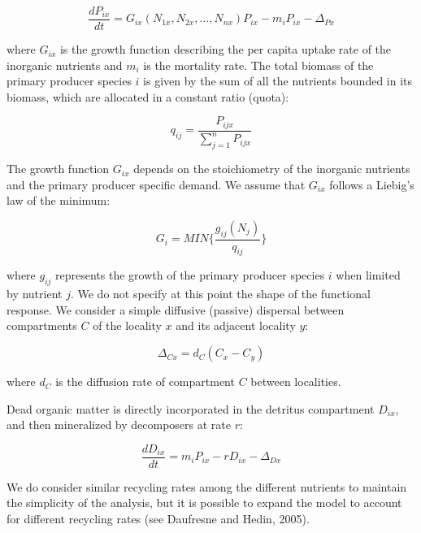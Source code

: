\documentclass[12pt]{paper}
\begin{document}
\begin{equation}
	\label{e:bnet}
	\frac{dP_{ix}}{dt}=G_{ix}(N_{1x},N_{2x},…,N_{nx})P_{ix}-m_{i}P_{ix}-\Delta_{Px}
\end{equation}

where $G_{ix}$ is the growth function describing the per capita uptake rate of the inorganic nutrients and $m_{i}$ is the mortality rate. The total biomass of the primary producer species $i$ is given by the sum of all the nutrients bounded in its biomass, which are allocated in a constant ratio (quota): 

\begin{equation}
	\label{e:bnet}
	q_{ij}=\frac{P_{ijx}}{\sum_{j=1}^{n}P_{ijx}}
\end{equation}

The growth function $G_{ix}$ depends on the stoichiometry of the inorganic nutrients and the primary producer specific demand. We assume that $G_{ix}$ follows a Liebig’s law of the minimum:

\begin{equation}
	\label{e:bnet}
	G_{i}=MIN\{\frac{g_{ij}(N_{j})}{q_{ij}}\}
\end{equation}

where $g_{ij}$ represents the growth of the primary producer species $i$ when limited by nutrient $j$. We do not specify at this point the shape of the functional response. We consider a simple diffusive (passive) dispersal between compartments $C$ of the locality $x$ and its adjacent locality $y$: 

\begin{equation}
	\label{e:bnet}
	\Delta_{Cx}=d_{C}(C_{x}-C_{y})
\end{equation}

where $d_{C}$ is the diffusion rate of compartment $C$ between localities.  

Dead organic matter is directly incorporated in the detritus compartment $D_{ix}$, and then mineralized by decomposers at rate $r$:

\begin{equation}
	\label{e:bnet}
	\frac{dD_{ix}}{dt}=m_{i}P_{ix}-rD_{ix}-\Delta_{Dx}
\end{equation}

We do consider similar recycling rates among the different nutrients to maintain the simplicity of the analysis, but it is possible to expand the model to account for different recycling rates (see Daufresne and Hedin, 2005). 
\end{document}
